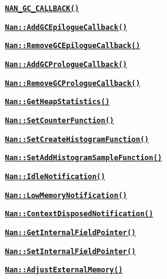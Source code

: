 \begin{DoxyItemize}
\item \href{doc/v8_internals.md#api_nan_gc_callback}{\tt {\bfseries {\ttfamily N\+A\+N\+\_\+\+G\+C\+\_\+\+C\+A\+L\+L\+B\+A\+C\+K()}}}
\item \href{doc/v8_internals.md#api_nan_add_gc_epilogue_callback}{\tt {\bfseries {\ttfamily Nan\+::\+Add\+G\+C\+Epilogue\+Callback()}}}
\item \href{doc/v8_internals.md#api_nan_remove_gc_epilogue_callback}{\tt {\bfseries {\ttfamily Nan\+::\+Remove\+G\+C\+Epilogue\+Callback()}}}
\item \href{doc/v8_internals.md#api_nan_add_gc_prologue_callback}{\tt {\bfseries {\ttfamily Nan\+::\+Add\+G\+C\+Prologue\+Callback()}}}
\item \href{doc/v8_internals.md#api_nan_remove_gc_prologue_callback}{\tt {\bfseries {\ttfamily Nan\+::\+Remove\+G\+C\+Prologue\+Callback()}}}
\item \href{doc/v8_internals.md#api_nan_get_heap_statistics}{\tt {\bfseries {\ttfamily Nan\+::\+Get\+Heap\+Statistics()}}}
\item \href{doc/v8_internals.md#api_nan_set_counter_function}{\tt {\bfseries {\ttfamily Nan\+::\+Set\+Counter\+Function()}}}
\item \href{doc/v8_internals.md#api_nan_set_create_histogram_function}{\tt {\bfseries {\ttfamily Nan\+::\+Set\+Create\+Histogram\+Function()}}}
\item \href{doc/v8_internals.md#api_nan_set_add_histogram_sample_function}{\tt {\bfseries {\ttfamily Nan\+::\+Set\+Add\+Histogram\+Sample\+Function()}}}
\item \href{doc/v8_internals.md#api_nan_idle_notification}{\tt {\bfseries {\ttfamily Nan\+::\+Idle\+Notification()}}}
\item \href{doc/v8_internals.md#api_nan_low_memory_notification}{\tt {\bfseries {\ttfamily Nan\+::\+Low\+Memory\+Notification()}}}
\item \href{doc/v8_internals.md#api_nan_context_disposed_notification}{\tt {\bfseries {\ttfamily Nan\+::\+Context\+Disposed\+Notification()}}}
\item \href{doc/v8_internals.md#api_nan_get_internal_field_pointer}{\tt {\bfseries {\ttfamily Nan\+::\+Get\+Internal\+Field\+Pointer()}}}
\item \href{doc/v8_internals.md#api_nan_set_internal_field_pointer}{\tt {\bfseries {\ttfamily Nan\+::\+Set\+Internal\+Field\+Pointer()}}}
\item \href{doc/v8_internals.md#api_nan_adjust_external_memory}{\tt {\bfseries {\ttfamily Nan\+::\+Adjust\+External\+Memory()}}}
\end{DoxyItemize}

